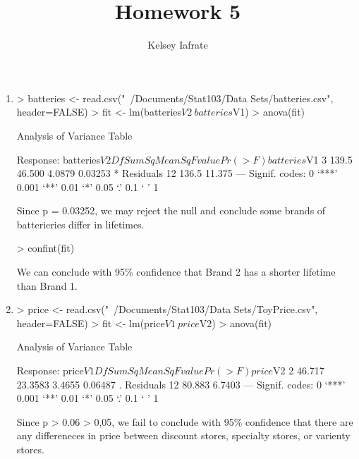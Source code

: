 \documentclass{article}
\title{Homework 5}
\author{Kelsey Iafrate}
\begin{document}
\maketitle



\begin{enumerate}

\item
\begin{Schunk}
\begin{Sinput}
> batteries <- read.csv("~/Documents/Stat103/Data Sets/batteries.csv", header=FALSE)
> fit <- lm(batteries$V2~batteries$V1)
> anova(fit)
\end{Sinput}
\begin{Soutput}
Analysis of Variance Table

Response: batteries$V2
             Df Sum Sq Mean Sq F value  Pr(>F)  
batteries$V1  3  139.5  46.500  4.0879 0.03253 *
Residuals    12  136.5  11.375                  
---
Signif. codes:  0 ‘***’ 0.001 ‘**’ 0.01 ‘*’ 0.05 ‘.’ 0.1 ‘ ’ 1
\end{Soutput}
\end{Schunk}

Since p = 0.03252, we may reject the null and conclude some brands of batterieries differ in lifetimes.

\begin{Schunk}
\begin{Sinput}
> confint(fit)
\end{Sinput}
\end{Schunk}

We can conclude with 95\% confidence that Brand 2 has a shorter lifetime than Brand 1.

\item

\begin{Schunk}
\begin{Sinput}
> price <- read.csv("~/Documents/Stat103/Data Sets/ToyPrice.csv", header=FALSE)
> fit <- lm(price$V1~price$V2)
> anova(fit)
\end{Sinput}
\begin{Soutput}
Analysis of Variance Table

Response: price$V1
          Df Sum Sq Mean Sq F value  Pr(>F)  
price$V2   2 46.717 23.3583  3.4655 0.06487 .
Residuals 12 80.883  6.7403                  
---
Signif. codes:  0 ‘***’ 0.001 ‘**’ 0.01 ‘*’ 0.05 ‘.’ 0.1 ‘ ’ 1
\end{Soutput}
\end{Schunk}

Since p > 0.06 > 0,05, we fail to conclude with 95\% confidence that there are any differeneces in price between discount stores, specialty stores, or varienty stores.

\end{enumerate}
\end{document}
